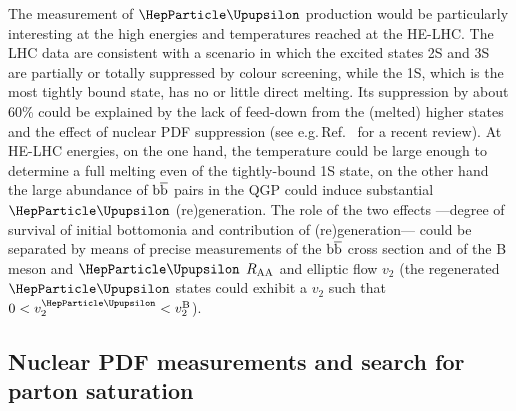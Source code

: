 \documentclass[../report.tex]{subfiles}
\begin{document}
The measurement of $\PGU$ production would be particularly interesting
at the high
energies and temperatures reached at the HE-LHC.
The LHC data are consistent with a scenario in which the excited
states 2S and 3S are partially or totally suppressed by colour
screening, while the 1S, which is the most tightly bound state, has no
or little direct melting. Its suppression by about 60\% could be explained by the lack of feed-down from the (melted) higher states and the effect of nuclear PDF suppression
(see e.g.\,Ref.~\cite{Andronic:2015wma} for a recent review).
At HE-LHC energies, on the one hand, the temperature could be large
enough to determine a full melting even of the tightly-bound 1S state,
on the other hand the large abundance of $\rm b\overline b$ pairs in the
QGP could induce substantial $\PGU$ (re)generation.
The role of the two effects ---degree of survival of initial bottomonia and contribution of
(re)generation--- could be separated by means of precise measurements of
the $\rm b\overline b$ cross section
and of the B meson and $\PGU$ $R_{\rm AA}$ and elliptic flow $v_2$ 
(the regenerated $\PGU$ states could exhibit a $v_2$ such that $0<v_2^{\PGU}<v_2^{\rm B}$).

  
\subsection{Nuclear PDF measurements and search for parton saturation}
\label{sec:HE_smallx}

\newcommand{\pizero}{\ensuremath{\pi^{0}}}
\newcommand{\ptjet}{\ensuremath{p_\mathrm{T,jet}}}


\end{document}
